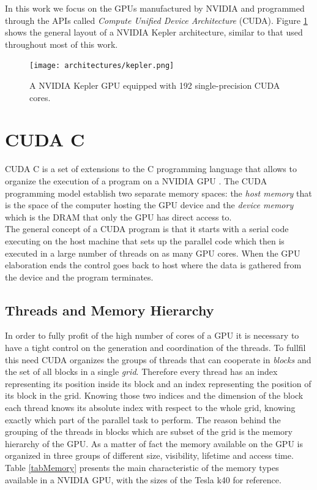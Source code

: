In this work we focus on the GPUs manufactured by NVIDIA and programmed through the APIs called \textit{Compute Unified Device Architecture} (CUDA).
Figure \ref{kepler} shows the general layout of a NVIDIA Kepler architecture, similar to that used throughout most of this work.

\begin{figure}
\centerline{\texttt{[image: architectures/kepler.png]}}
\caption{A NVIDIA Kepler GPU equipped with 192 single-precision CUDA cores.}
\label{kepler}
\end{figure}

\section{CUDA C}
CUDA C is a set of extensions to the C programming language that allows to organize the execution of a program on a NVIDIA GPU \cite{cuda}.
The CUDA programming model establish two separate memory spaces: the \textit{host memory} that is the space of the computer hosting the GPU device and the \textit{device memory} which is the DRAM that only the GPU has direct access to.\\
The general concept of a CUDA program is that it starts with a serial code executing on the host machine that sets up the parallel code which then is executed in a large number of threads on as many GPU cores. When the GPU elaboration ends the control goes back to host where the data is gathered from the device and the program terminates.

\subsection{Threads and Memory Hierarchy} 
In order to fully profit of the high number of cores of a GPU it is necessary to have a tight control on the generation and coordination of the threads.
To fullfil this need CUDA organizes the groups of threads that can cooperate in \textit{blocks} and the set of all blocks in a single \textit{grid}.
Therefore every thread has an index representing its position inside its block and an index representing the position of its block in the grid.
Knowing those two indices and the dimension of the block each thread knows its absolute index with respect to the whole grid, knowing exactly which part of the parallel task to perform.
The reason behind the grouping of the threads in blocks which are subset of the grid is the memory hierarchy of the GPU. As a matter of fact the memory available on the GPU is organized in three groups of different size, visibility, lifetime and access time. Table \ref{tabMemory} presents the main characteristic of the memory types available in a NVIDIA GPU, with the sizes of the Tesla k40 for reference.

